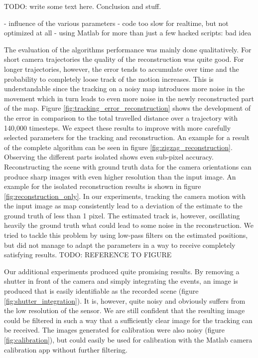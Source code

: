 TODO: write some text here. Conclusion and stuff.

- influence of the various parameters
- code too slow for realtime, but not optimized at all
- using Matlab for more than just a few hacked scripts: bad idea

The evaluation of the algorithms performance was mainly done qualitatively.
For short camera trajectories the quality of the reconstruction was quite good.
For longer trajectories, however, the error tends to accumulate over time and the
probability to completely loose track of the motion increases.
This is understandable since the tracking on a noisy map introduces more noise
in the movement which in turn leads to even more noise in the newly reconstructed
part of the map.
Figure \ref{fig:tracking_error_reconstruction} shows the development of the error
in comparison to the total travelled distance over a trajectory with 140,000 timesteps.
We expect these results to improve with more carefully selected parameters for the
tracking and reconstruction.
An example for a result of the complete algorithm can be seen in figure \ref{fig:zigzag_reconstruction}.
Observing the different parts isolated shows even sub-pixel accuracy.
Reconstructing the scene with ground truth data for the camera orientations can produce sharp images
with even higher resolution than the input image. An example for the isolated reconstruction results
is shown in figure \ref{fig:reconstruction_only}.
In our experiments, tracking the camera motion with the input image as map consistently lead to a deviation
of the estimate to the ground truth of less than 1 pixel. The estimated track is, however, oscillating heavily
the ground truth what could lead to some noise in the reconstruction. We tried to tackle
this problem by using low-pass filters on the estimated positions, but did not manage to
adapt the parameters in a way to receive completely satisfying results.
TODO: REFERENCE TO FIGURE

Our additional experiments produced quite promising results.
By removing a shutter in front of the camera and simply integrating the events,
an image is produced that is easily identifiable as the recorded scene (figure \ref{fig:shutter_integration}).
It is, however, quite noisy and obviously suffers from the low resolution of the sensor.
We are still confident that the resulting image could be filtered in such a way that
a sufficiently clear image for the tracking can be received.
The images generated for calibration were also noisy (figure \ref{fig:calibration}), but could easily be used
for calibration with the Matlab camera calibration app without further filtering.

